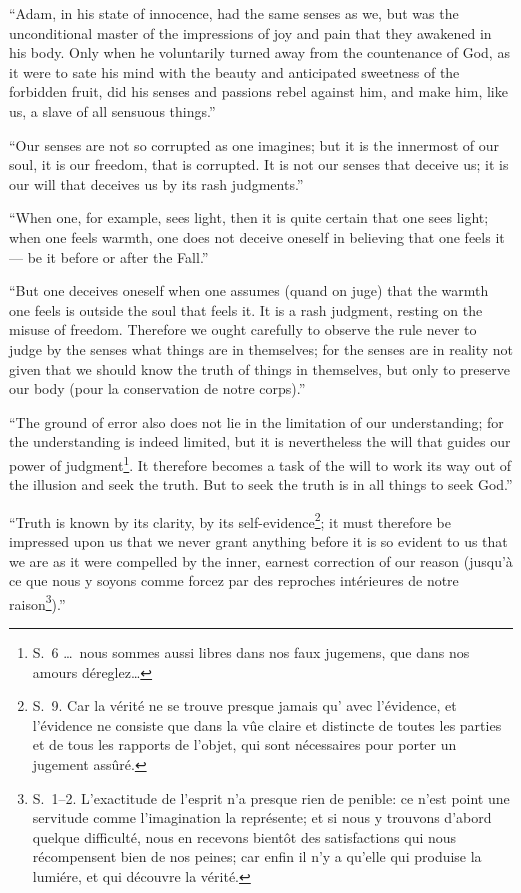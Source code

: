 \documentclass[12pt,a4paper]{article}
\begin{document}
``Adam, in his state of innocence, had the same senses as we, but was the
unconditional master of the impressions of joy and pain that they awakened in his
body. Only when he voluntarily turned away from the countenance of God, as it
were to sate his mind with the beauty and anticipated sweetness of the forbidden
fruit, did his senses and passions rebel against him, and make him, like us, a
slave of all sensuous things.''

``Our senses are not so corrupted as one imagines; but it is the innermost of our
soul, it is our freedom, that is corrupted. It is
not our senses that deceive us; it is our will that deceives us by its rash
judgments.''

``When one, for example, sees light, then it is quite certain that one sees
light; when one feels warmth, one does not deceive oneself in believing that one
feels it --- be it before or after the Fall.''

``But one deceives oneself when one assumes (quand on juge) that the warmth one
feels is outside the soul that feels it. It is a rash judgment, resting on the
misuse of freedom. Therefore we ought carefully to observe the rule never to
judge by the senses what things are in themselves; for the senses are in reality
not given that we should know the truth of things in themselves, but only to
preserve our body (pour la conservation de notre corps).''

``The ground of error also does not lie in the limitation of our understanding;
for the understanding is indeed limited, but it is nevertheless the will that
guides our power of judgment\footnote{S.~6 \dots\ nous sommes aussi libres dans
nos faux jugemens, que dans nos amours déreglez\dots}. It therefore becomes a
task of the will to work its way out of the illusion and seek the truth. But to
seek the truth is in all things to seek God.''

``Truth is known by its clarity, by its self-evidence\footnote{S.~9. Car la
vérité ne se trouve presque jamais qu' avec l'évidence, et l'évidence ne consiste
que dans la vûe claire et distincte de toutes les parties et de tous les rapports
de l'objet, qui sont nécessaires pour porter un jugement assûré.}; it must
therefore be impressed upon us that we never grant anything before it is so
evident to us that we are as it were compelled by the inner, earnest correction
of our reason (jusqu'à ce que nous y soyons comme forcez par des reproches
intérieures de notre raison\footnote{S.~1--2. L'exactitude de l'esprit n'a presque
rien de penible: ce n'est point une servitude comme l'imagination la représente;
et si nous y trouvons d'abord quelque difficulté, nous en recevons bientôt des
satisfactions qui nous récompensent bien de nos peines; car enfin il n'y a
qu'elle qui produise la lumiére, et qui découvre la vérité.}).''
\end{document}
